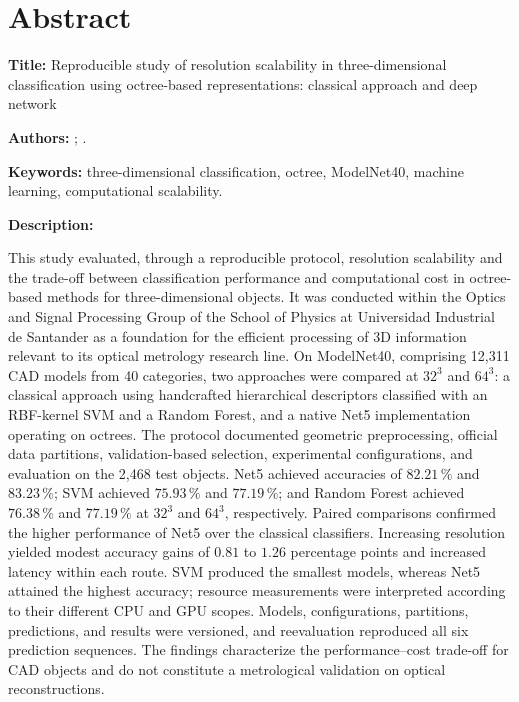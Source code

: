 \chapter*{Abstract}

\noindent\textbf{Title:} Reproducible study of resolution scalability in three-dimensional classification using octree-based representations: classical approach and deep network\footnotemark[1]

\smallskip
\noindent\textbf{Authors:} \AutorUno; \AutorDos.\footnotemark[2]

\smallskip
\noindent\textbf{Keywords:} three-dimensional classification, octree, ModelNet40, machine learning, computational scalability.

\smallskip
\noindent\textbf{Description:}

This study evaluated, through a reproducible protocol, resolution scalability and the trade-off between classification performance and computational cost in octree-based methods for three-dimensional objects. It was conducted within the Optics and Signal Processing Group of the School of Physics at Universidad Industrial de Santander as a foundation for the efficient processing of 3D information relevant to its optical metrology research line. On ModelNet40, comprising 12,311 CAD models from 40 categories, two approaches were compared at $32^3$ and $64^3$: a classical approach using handcrafted hierarchical descriptors classified with an RBF-kernel SVM and a Random Forest, and a native Net5 implementation operating on octrees. The protocol documented geometric preprocessing, official data partitions, validation-based selection, experimental configurations, and evaluation on the 2,468 test objects. Net5 achieved accuracies of $82.21\,\%$ and $83.23\,\%$; SVM achieved $75.93\,\%$ and $77.19\,\%$; and Random Forest achieved $76.38\,\%$ and $77.19\,\%$ at $32^3$ and $64^3$, respectively. Paired comparisons confirmed the higher performance of Net5 over the classical classifiers. Increasing resolution yielded modest accuracy gains of $0.81$ to $1.26$ percentage points and increased latency within each route. SVM produced the smallest models, whereas Net5 attained the highest accuracy; resource measurements were interpreted according to their different CPU and GPU scopes. Models, configurations, partitions, predictions, and results were versioned, and reevaluation reproduced all six prediction sequences. The findings characterize the performance--cost trade-off for CAD objects and do not constitute a metrological validation on optical reconstructions.

